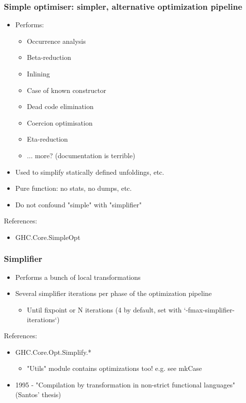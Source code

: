 \documentclass[aspectratio=169]{beamer}
\begin{document}
\begin{frame}
  \frametitle{Simple optimiser: simpler, alternative optimization pipeline}

  \begin{itemize}
    \item Performs:
      \begin{itemize}
        \item Occurrence analysis
        \item Beta-reduction
        \item Inlining
        \item Case of known constructor
        \item Dead code elimination
        \item Coercion optimisation
        \item Eta-reduction
        \item ... more? (documentation is terrible)
      \end{itemize}
    \item Used to simplify statically defined unfoldings, etc.
    \item Pure function: no stats, no dumps, etc.
    \item Do not confound "simple" with "simplifier"
  \end{itemize}

  References:
  \begin{itemize}
    \item GHC.Core.SimpleOpt
  \end{itemize}
\end{frame}

\begin{frame}
  \frametitle{Simplifier}
  \begin{itemize}
    \item Performs a bunch of local transformations
    \item Several simplifier iterations per phase of the optimization pipeline
      \begin{itemize}
        \item Until fixpoint or N iterations (4 by default, set with
          `-fmax-simplifier-iterations`)
      \end{itemize}
  \end{itemize}

  References:
  \begin{itemize}
    \item GHC.Core.Opt.Simplify.*
      \begin{itemize}
        \item "Utils" module contains optimizations too! e.g. see mkCase
      \end{itemize}
    \item 1995 - "Compilation by transformation in non-strict functional
      languages" (Santos' thesis)
  \end{itemize}
\end{frame}
\end{document}
